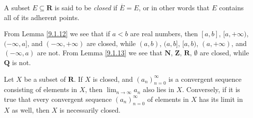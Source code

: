 \begin{definition}\label{9.1.15}
    A subset \(E \subseteq \mathbf{R}\) is said to be \emph{closed} if \(\overline{E} = E\), or in other words that \(E\) contains all of its adherent points.
\end{definition}

\begin{example}\label{9.1.16}
    From Lemma \ref{9.1.12} we see that if \(a < b\) are real numbers, then \([a, b]\), \([a, +\infty)\), \((-\infty, a]\), and \((-\infty, +\infty)\) are closed, while \((a, b)\), \((a, b]\), \([a, b)\), \((a, +\infty)\), and \((-\infty, a)\) are not.
    From Lemma \ref{9.1.13} we see that \(\mathbf{N}\), \(\mathbf{Z}\), \(\mathbf{R}\), \(\emptyset\) are closed, while \(\mathbf{Q}\) is not.
\end{example}

\begin{corollary}\label{9.1.17}
    Let \(X\) be a subset of \(\mathbf{R}\).
    If \(X\) is closed, and \((a_n)_{n = 0}^\infty\) is a convergent sequence consisting of elements in \(X\), then \(\lim_{n \to \infty} a_n\) also lies in \(X\).
    Conversely, if it is true that every convergent sequence \((a_n)_{n = 0}^\infty\) of elements in \(X\) has its limit in \(X\) as well, then \(X\) is necessarily closed.
\end{corollary}

